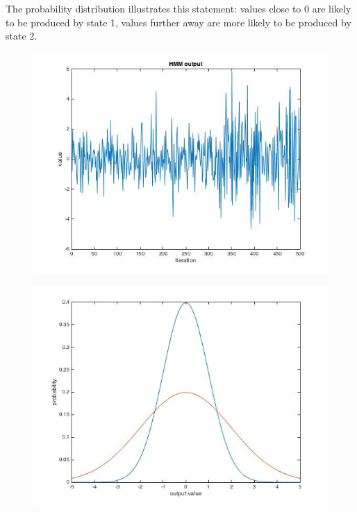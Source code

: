 The probability distribution illustrates this statement: values close to 0 are likely to be produced by state 1, values further away are more likely to be produced by state 2.
\begin{figure}[H]
\centering
\begin{minipage}{.5\textwidth}
	\centering
	\includegraphics[width=.9\linewidth]{images/question_5_HMM_plot}
	\label{fig:question_5_HMM_plot}
\end{minipage}%
\begin{minipage}{.5\textwidth}
	\centering
	\includegraphics[width=.9\linewidth]{images/question_5_probability_distributions}
	\label{fig:question_5_probability_distributions}
\end{minipage}
\end{figure}


